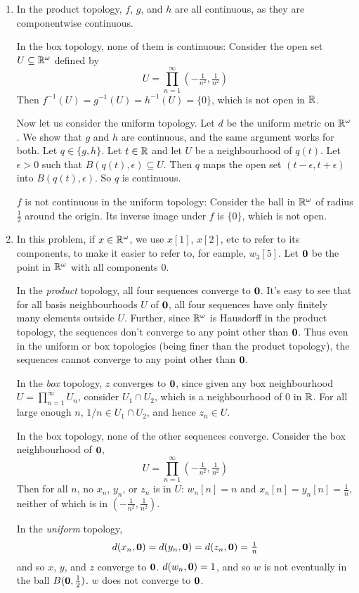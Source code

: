 \begin{enumerate}
\item In the product topology, $f$, $g$, and $h$ are all continuous, as they are componentwise continuous.

In the box topology, none of them is continuous: Consider the open set $U \subseteq \mathbb R^\omega$ defined by
\[U = \prod_{n=1}^\infty \left(-\tfrac{1}{n^2}, \tfrac{1}{n^2} \right)\]
Then $f^{-1}(U) = g^{-1}(U) = h^{-1}(U) = \{0\}$, which is not open in $\mathbb R$.

Now let us consider the uniform topology. Let $d$ be the uniform metric on $\mathbb R^\omega$. We show that $g$ and $h$ are continuous, and the same argument works for both. Let $q \in \{g,h\}$. Let $t \in \mathbb R$ and let $U$ be a neighbourhood of $q(t)$. Let $\epsilon > 0$ such that $B(q(t), \epsilon) \subseteq U$. Then $q$ maps the open set $(t-\epsilon, t+\epsilon)$ into $B(q(t), \epsilon)$. So $q$ is continuous.

$f$ is not continuous in the uniform topology: Consider the ball in $\mathbb R^\omega$ of radius $\frac12$ around the origin. Its inverse image under $f$ is $\{0\}$, which is not open.

\item In this problem, if $x \in \mathbb R^\omega$, we use $x[1]$, $x[2]$, etc to refer to its components, to make it easier to refer to, for eample, $w_3[5]$. Let $\mathbf 0$ be the point in $\mathbb R^\omega$ with all components $0$.

In the \emph{product} topology, all four sequences converge to $\mathbf 0$. It's easy to see that for all basis neighbourhoods $U$ of $\mathbf 0$, all four sequences have only finitely many elements outside $U$. Further, since $\mathbb R^\omega$ is Hausdorff in the product topology, the sequences don't converge to any point other than $\mathbf 0$. Thus even in the uniform or box topologies (being finer than the product topology), the sequences cannot converge to any point other than $\mathbf 0$.

In the \emph{box} topology, $z$ converges to $\mathbf 0$, since given any box neighbourhood $U = \prod_{n=1}^\infty U_n$, consider $U_1 \cap U_2$, which is a neighbourhood of $0$ in $\mathbb R$. For all large enough $n$, $1/n \in U_1 \cap U_2$, and hence $z_n \in U$.

In the box topology, none of the other sequences converge. Consider the box neighbourhood of $\mathbf 0$,
\[U = \prod_{n=1}^\infty \left(-\tfrac{1}{n^2}, \tfrac{1}{n^2} \right)\]
Then for all $n$, no $x_n$, $y_n$, or $z_n$ is in $U$: $w_n[n] = n$ and $x_n[n] = y_n[n] = \frac1n$, neither of which is in $(-\frac{1}{n^2}, \frac{1}{n^2})$.

In the \emph{uniform} topology,
\[d(x_n,\mathbf 0) = d(y_n,\mathbf 0) = d(z_n, \mathbf 0) = \tfrac1n\]
and so $x$, $y$, and $z$ converge to $\mathbf 0$. $d(w_n, \mathbf 0) = 1$, and so $w$ is not eventually in the ball $B(\mathbf 0, \frac12)$. $w$ does not converge to $\mathbf 0$.
\end{enumerate}
